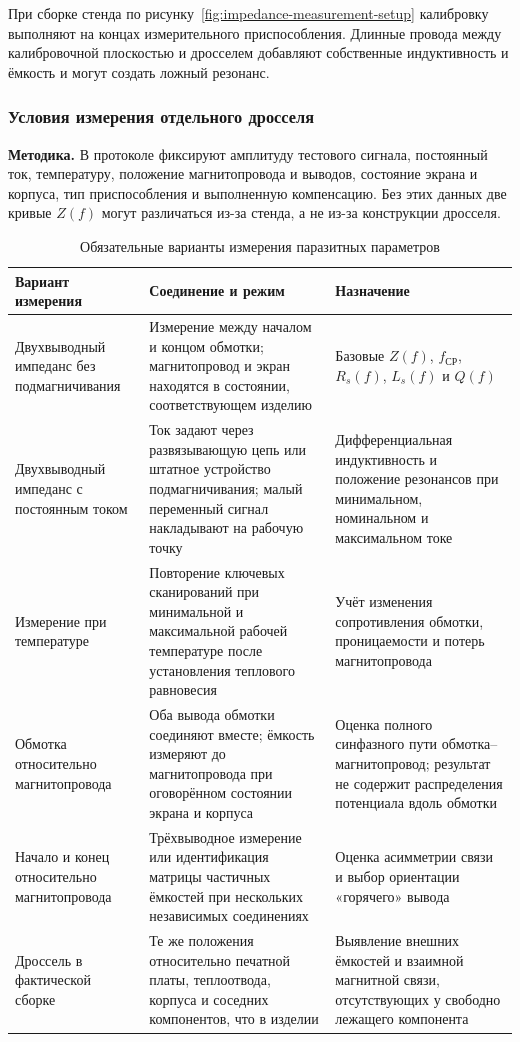\documentclass[14pt,a4paper]{extarticle}
\newcommand{\method}{\par\noindent\textbf{Методика.} }
\begin{document}
При сборке стенда по рисунку~\ref{fig:impedance-measurement-setup}
калибровку выполняют на концах измерительного приспособления. Длинные
провода между калибровочной плоскостью и дросселем добавляют собственные
индуктивность и ёмкость и могут создать ложный резонанс.

\subsubsection{Условия измерения отдельного дросселя}

\method В протоколе фиксируют амплитуду тестового сигнала, постоянный ток,
температуру, положение магнитопровода и выводов, состояние экрана и корпуса,
тип приспособления и выполненную компенсацию. Без этих данных две кривые
$Z(f)$ могут различаться из-за стенда, а не из-за конструкции дросселя.

\begin{table}[htbp]
\begin{singlespace}
\caption{Обязательные варианты измерения паразитных параметров}
\label{tab:required-parasitic-measurements}
\centering
\small
\begin{tabularx}{\textwidth}{>{\raggedright\arraybackslash}p{35mm}
>{\raggedright\arraybackslash}p{48mm}
>{\raggedright\arraybackslash}X}
\toprule
Вариант измерения & Соединение и режим & Назначение \\
\midrule
Двухвыводный импеданс без подмагничивания &
Измерение между началом и концом обмотки; магнитопровод и экран находятся в
состоянии, соответствующем изделию &
Базовые $Z(f)$, $f_{\text{СР}}$, $R_s(f)$, $L_s(f)$ и $Q(f)$ \\
Двухвыводный импеданс с постоянным током &
Ток задают через развязывающую цепь или штатное устройство подмагничивания;
малый переменный сигнал накладывают на рабочую точку &
Дифференциальная индуктивность и положение резонансов при минимальном,
номинальном и максимальном токе \\
Измерение при температуре &
Повторение ключевых сканирований при минимальной и максимальной рабочей
температуре после установления теплового равновесия &
Учёт изменения сопротивления обмотки, проницаемости и потерь
магнитопровода \\
Обмотка относительно магнитопровода &
Оба вывода обмотки соединяют вместе; ёмкость измеряют до магнитопровода при
оговорённом состоянии экрана и корпуса &
Оценка полного синфазного пути обмотка--магнитопровод; результат не содержит
распределения потенциала вдоль обмотки \\
Начало и конец относительно магнитопровода &
Трёхвыводное измерение или идентификация матрицы частичных ёмкостей при
нескольких независимых соединениях &
Оценка асимметрии связи и выбор ориентации «горячего» вывода \\
Дроссель в фактической сборке &
Те же положения относительно печатной платы, теплоотвода, корпуса и соседних
компонентов, что в изделии &
Выявление внешних ёмкостей и взаимной магнитной связи, отсутствующих у
свободно лежащего компонента \\
\bottomrule
\end{tabularx}
\end{singlespace}
\end{table}
\end{document}
